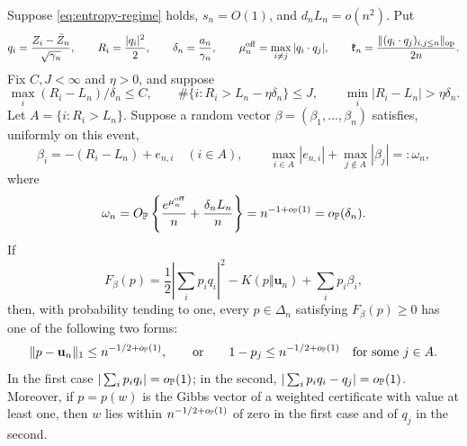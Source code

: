 \begin{lemma}
\label{lem:weighted-entropy-localization}
Suppose \eqref{eq:entropy-regime} holds, \(s_n=O(1)\), and
\(d_nL_n=o(n^2)\).  Put
\[
 q_i=\frac{Z_i-\bar Z_n}{\sqrt{\gamma_n}},
 \qquad
 R_i=\frac{|q_i|^2}{2},
 \qquad
 \delta_n=\frac{a_n}{\gamma_n},
 \qquad
 \mu_n^{\rm off}=\max_{i\ne j}|q_i\cdot q_j|,
 \qquad
 \mathfrak k_n=\frac{\|(q_i\cdot q_j)_{i,j\le n}\|_{\rm op}}{2n}.
\]
Fix \(C,J<\infty\) and \(\eta>0\), and suppose
\[
 \max_i(R_i-L_n)/\delta_n\le C,\qquad
 \#\{i:R_i>L_n-\eta\delta_n\}\le J,\qquad
 \min_i|R_i-L_n|>\eta\delta_n.
\]
Let \(A=\{i:R_i>L_n\}\).  Suppose a random vector
\(\beta=(\beta_1,\ldots,\beta_n)\) satisfies, uniformly on this event,
\begin{equation}
\label{eq:weighted-entropy-alpha-profile}
 \beta_i=-(R_i-L_n)+e_{n,i}\quad(i\in A),
 \qquad
 \max_{i\in A}|e_{n,i}|
 +\max_{j\notin A}|\beta_j|
 =:\omega_n,
\end{equation}
where
\begin{equation}
\label{eq:weighted-entropy-omega-rate}
 \omega_n
 =
 O_{\mathbb P}\left\{\frac{e^{\mu_n^{\rm off}}}n+\frac{\delta_nL_n}{n}\right\}
 =n^{-1+o_{\mathbb P}(1)}
 =o_{\mathbb P}(\delta_n).
\end{equation}
If
\[
 F_\beta(p)
 =
 \frac12\left|\sum_i p_iq_i\right|^2
 -K(p\Vert \mathbf u_n)+\sum_i p_i\beta_i,
\]
then, with probability tending to one, every \(p\in\Delta_n\) satisfying
\(F_\beta(p)\ge0\) has one of the following two forms:
\begin{equation}
\label{eq:weighted-entropy-two-patches}
 \|p-\mathbf u_n\|_1\le n^{-1/2+o_{\mathbb P}(1)},
 \qquad\text{or}\qquad
 1-p_j\le n^{-1/2+o_{\mathbb P}(1)}
 \quad\text{for some }j\in A.
\end{equation}
In the first case \(|\sum_i p_iq_i|=o_{\mathbb P}(1)\); in the second,
\(|\sum_i p_iq_i-q_j|=o_{\mathbb P}(1)\). Moreover, if \(p=p(w)\) is the
Gibbs vector of a weighted certificate with value at least one, then \(w\)
lies within \(n^{-1/2+o_{\mathbb P}(1)}\) of zero in the first case and of
\(q_j\) in the second.
\end{lemma}

